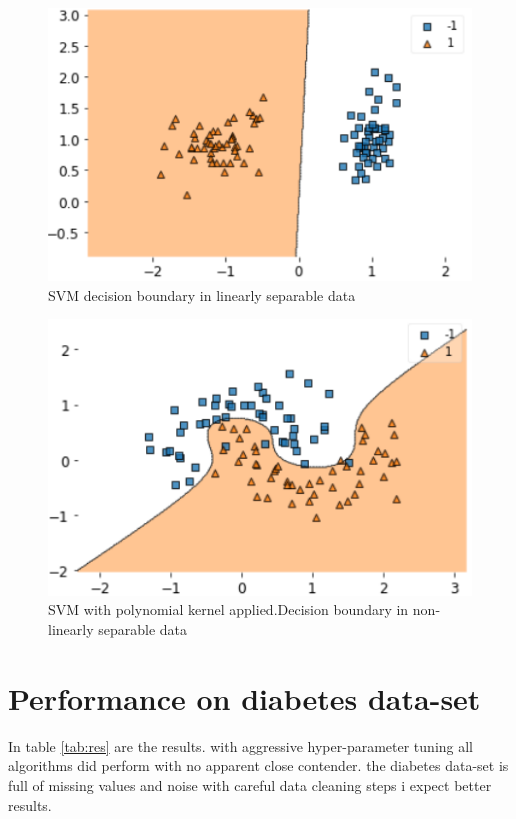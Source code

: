 \documentclass[10pt,twocolumn,letterpaper]{article}
\begin{document}
\vspace{3.00mm} 

\begin{figure}[htb]
  \includegraphics[width=\linewidth]{svm_lin_sep.png}
  \caption{SVM decision boundary in linearly separable data}
  \label{fig:svm_exp_lin}
\end{figure}

\vspace{50.00mm} 

\begin{figure}[htb]
  \includegraphics[width=\linewidth]{svm_k_non.png}
  \caption{SVM with polynomial kernel applied.Decision boundary in non-linearly separable data}
  \label{fig:svm_exp_k}
\end{figure}





\section{Performance on diabetes data-set}
In table \ref{tab:res} are the results. with aggressive hyper-parameter tuning all algorithms did perform with no apparent close contender. the diabetes data-set is full of missing values and noise with careful data cleaning steps i expect better results. 
\end{document}
